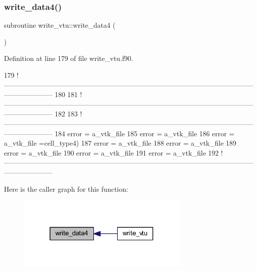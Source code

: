 \subsubsection{\texorpdfstring{write\+\_\+data4()}{write\_data4()}}
{\footnotesize\ttfamily subroutine write\+\_\+vtu\+::write\+\_\+data4 (\begin{DoxyParamCaption}{ }\end{DoxyParamCaption})}



Definition at line 179 of file write\+\_\+vtu.\+f90.


\begin{DoxyCode}
179   \textcolor{comment}{
      !---------------------------------------------------------------------------------------------------------------------------------}
180   
181   \textcolor{comment}{
      !---------------------------------------------------------------------------------------------------------------------------------}
182 
183   \textcolor{comment}{
      !---------------------------------------------------------------------------------------------------------------------------------}
184   error = a\_vtk\_file%
185   error = a\_vtk\_file%
186   error = a\_vtk\_file%
      =cell\_type4)
187   error = a\_vtk\_file%
188   error = a\_vtk\_file%
189   error = a\_vtk\_file%
190   error = a\_vtk\_file%
191   error = a\_vtk\_file%
192   \textcolor{comment}{
      !---------------------------------------------------------------------------------------------------------------------------------}
\end{DoxyCode}
Here is the caller graph for this function\+:\nopagebreak
\begin{figure}[H]
\begin{center}
\leavevmode
\includegraphics[width=236pt]{write__vtu_8f90_a2a0b4e97269ec439c6dd440509f9742c_icgraph}
\end{center}
\end{figure}
\mbox{\label{write__vtu_8f90_a8bbc7ab4725ee50b236ba1ffab6f3b88}} 
